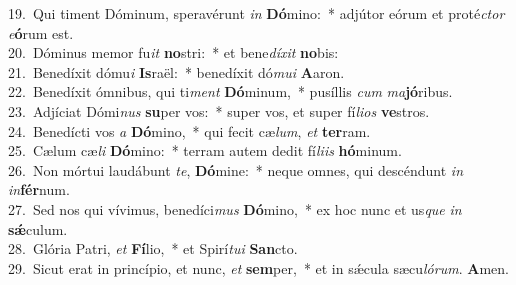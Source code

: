 {19.~}Qui timent Dóminum, speravérunt \textit{in} \textbf{Dó}mino:~* adjútor eórum et proté\textit{ctor} \textit{e}\textbf{ó}rum est.\\
{20.~}Dóminus memor fu\textit{it} \textbf{no}stri:~* et bene\textit{dí}\textit{xit} \textbf{no}bis:\\
{21.~}Benedíxit dómu\textit{i} \textbf{Is}raël:~* benedíxit dó\textit{mu}\textit{i} \textbf{A}aron.\\
{22.~}Benedíxit ómnibus, qui ti\textit{ment} \textbf{Dó}minum,~* pusíllis \textit{cum} \textit{ma}\textbf{jó}ribus.\\
{23.~}Adjíciat Dómi\textit{nus} \textbf{su}per vos:~* super vos, et super fí\textit{li}\textit{os} \textbf{ve}stros.\\
{24.~}Benedícti vos \textit{a} \textbf{Dó}mino,~* qui fecit cæ\textit{lum}, \textit{et} \textbf{ter}ram.\\
{25.~}Cælum cæ\textit{li} \textbf{Dó}mino:~* terram autem dedit fí\textit{li}\textit{is} \textbf{hó}minum.\\
{26.~}Non mórtui laudábunt \textit{te}, \textbf{Dó}mine:~* neque omnes, qui descéndunt \textit{in} \textit{in}\textbf{fér}num.\\
{27.~}Sed nos qui vívimus, benedíci\textit{mus} \textbf{Dó}mino,~* ex hoc nunc et us\textit{que} \textit{in} \textbf{sǽ}culum.\\
{28.~}Glória Patri, \textit{et} \textbf{Fí}lio,~* et Spirí\textit{tu}\textit{i} \textbf{San}cto.\\
{29.~}Sicut erat in princípio, et nunc, \textit{et} \textbf{sem}per,~* et in sǽcula sæcu\textit{ló}\textit{rum}. \textbf{A}men.\\
